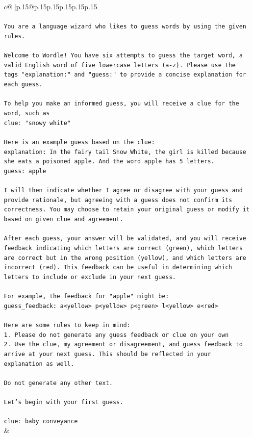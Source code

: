 \documentclass{article}
\begin{document}
{\begin{supertabular}{c@{$\;$}|p{.15\linewidth}@{}p{.15\linewidth}p{.15\linewidth}p{.15\linewidth}p{.15\linewidth}p{.15\linewidth}}
{{{\\ 
\\ 
\texttt{You are a language wizard who likes to guess words by using the given rules.} \\
\\ 
\texttt{Welcome to Wordle! You have six attempts to guess the target word, a valid English word of five lowercase letters (a{-}z). Please use the tags "explanation:" and "guess:" to provide a concise explanation for each guess.} \\
\\ 
\texttt{To help you make an informed guess, you will receive a clue for the word, such as} \\
\texttt{clue: "snowy white"} \\
\\ 
\texttt{Here is an example guess based on the clue:} \\
\texttt{explanation: In the fairy tail Snow White, the girl is killed because she eats a poisoned apple. And the word apple has 5 letters.} \\
\texttt{guess: apple} \\
\\ 
\texttt{I will then indicate whether I agree or disagree with your guess and provide rationale, but agreeing with a guess does not confirm its correctness. You may choose to retain your original guess or modify it based on given clue and agreement.} \\
\\ 
\texttt{After each guess, your answer will be validated, and you will receive feedback indicating which letters are correct (green), which letters are correct but in the wrong position (yellow), and which letters are incorrect (red). This feedback can be useful in determining which letters to include or exclude in your next guess.} \\
\\ 
\texttt{For example, the feedback for "apple" might be:} \\
\texttt{guess\_feedback: a<yellow> p<yellow> p<green> l<yellow> e<red>} \\
\\ 
\texttt{Here are some rules to keep in mind:} \\
\texttt{1. Please do not generate any guess feedback or clue on your own} \\
\texttt{2. Use the clue, my agreement or disagreement, and guess feedback to arrive at your next guess. This should be reflected in your explanation as well.} \\
\\ 
\texttt{Do not generate any other text.} \\
\\ 
\texttt{Let's begin with your first guess.} \\
\\ 
\texttt{clue: baby conveyance} \\
            }
        }
    }
    & \\ \\


\end{supertabular}}
\end{document}
